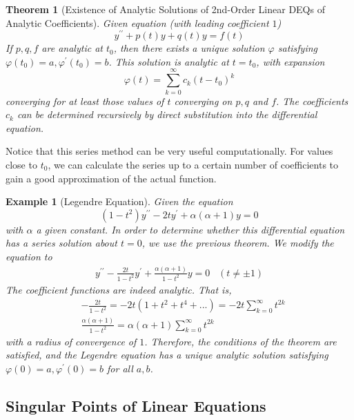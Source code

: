 \documentclass{article}
\newtheorem{theorem}{Theorem}[section]
\newtheorem{example}{Example}[section]
\theoremstyle{remark}
\theoremstyle{definition}
\begin{document}
    \begin{theorem}[Existence of Analytic Solutions of 2nd-Order Linear DEQs of Analytic Coefficients]
    Given equation (with leading coefficient $1$)
    \[y^{\prime\prime} + p(t) y + q(t) y = f(t)\]
    If $p, q, f$ are analytic at $t_0$, then there exists a unique solution $\varphi$ satisfying $\varphi (t_0) = a, \varphi^\prime (t_0) = b$. This solution is analytic at $t = t_0$, with expansion
    \[\varphi(t) = \sum_{k=0}^\infty c_k (t-t_0)^k\]
    converging for at least those values of $t$ converging on $p, q$ and $f$. The coefficients $c_k$ can be determined recursively by direct substitution into the differential equation. 
    \end{theorem}

    Notice that this series method can be very useful computationally. For values close to $t_0$, we can calculate the series up to a certain number of coefficients to gain a good approximation of the actual function. 

    \begin{example}[Legendre Equation]
    Given the equation
    \[(1 - t^2) y^{\prime \prime} - 2 t y^\prime + \alpha (\alpha + 1) y = 0\]
    with $\alpha$ a given constant. In order to determine whether this differential equation has a series solution about $t=0$, we use the previous theorem. We modify the equation to
    \begin{align*}
        y^{\prime\prime} - \frac{2 t}{1 - t^2} y^\prime + \frac{\alpha (\alpha + 1)}{1 - t^2} y = 0 \;\;\; (t \neq \pm 1) 
    \end{align*}
    The coefficient functions are indeed analytic. That is, 
    \begin{align*}
        & - \frac{2t}{1 - t^2} = -2 t (1 + t^2 + t^4 + ... ) = -2t \sum_{k=0}^\infty t^{2k} \\
        & \frac{\alpha(\alpha+1)}{1 - t^2} = \alpha (\alpha + 1) \sum_{k=0}^\infty t^{2k}
    \end{align*}
    with a radius of convergence of $1$. Therefore, the conditions of the theorem are satisfied, and the Legendre equation has a unique analytic solution satisfying $\varphi(0) = a, \varphi^\prime (0) = b$ for all $a, b$. 
    \end{example}

  \subsection{Singular Points of Linear Equations}
\end{document}
